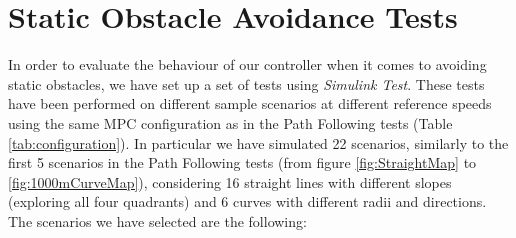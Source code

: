 \section{Static Obstacle Avoidance Tests} 
In order to evaluate the behaviour of our controller when it comes to avoiding static obstacles, we have set up a set of tests using \textit{Simulink Test}. These tests have been performed on different sample scenarios at different reference speeds using the same MPC configuration as in the Path Following tests (Table \ref{tab:configuration}). In particular we have simulated 22 scenarios, similarly to the first 5 scenarios in the Path Following tests (from figure \ref{fig:StraightMap} to \ref{fig:1000mCurveMap}), considering 16 straight lines with different slopes (exploring all four quadrants) and 6 curves with different radii and directions.
The scenarios we have selected are the following:
